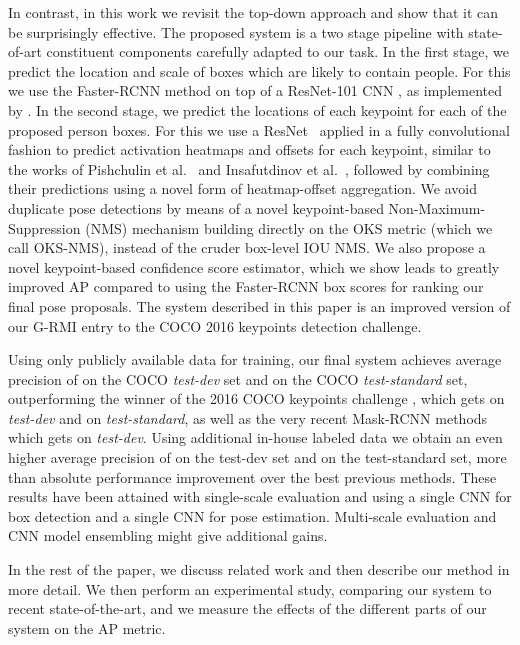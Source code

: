 \documentclass[10pt,twocolumn,letterpaper]{article}
\begin{document}
In contrast, in this work we revisit the top-down approach and show that it can be surprisingly effective. The proposed system is a two stage pipeline with state-of-art constituent components carefully adapted to our task. In the first stage, we predict the location and scale of boxes which are likely to contain people. For this we use the Faster-RCNN method \cite{Ren2015} on top of a ResNet-101 CNN \cite{He2016ResNets}, as implemented by \cite{huang2016speed}. In the second stage, we predict the locations of each keypoint for each of the proposed person boxes. For this we use a ResNet~\cite{He2016ResNets} applied in a fully convolutional fashion to predict activation heatmaps and offsets for each keypoint, similar to the works of Pishchulin et al.~\cite{deepcut} and Insafutdinov et al.~\cite{deeper_cut}, followed by combining their predictions using a novel form of heatmap-offset aggregation. We avoid duplicate pose detections by means of a novel keypoint-based Non-Maximum-Suppression (NMS) mechanism building directly on the OKS metric (which we call OKS-NMS), instead of the cruder box-level IOU NMS. We also propose a novel keypoint-based confidence score estimator, which we show leads to greatly improved AP compared to using the Faster-RCNN box scores for ranking our final pose proposals. The system described in this paper is an improved version of our G-RMI entry to the COCO 2016 keypoints detection challenge.

Using only publicly available data for training, our final system achieves average precision of  on the COCO \emph{test-dev} set and  on the COCO \emph{test-standard} set, outperforming the winner of the 2016 COCO keypoints challenge \cite{cmu_mscoco}, which gets  on \emph{test-dev} and  on \emph{test-standard}, as well as the very recent Mask-RCNN \cite{he2017mask} methods which gets  on \emph{test-dev}. Using additional in-house labeled data we obtain an even higher average precision of  on the test-dev set and  on the test-standard set, more than  absolute performance improvement over the best previous methods. These results have been attained with single-scale evaluation and using a single CNN for box detection and a single CNN for pose estimation. Multi-scale evaluation and CNN model ensembling might give additional gains.

In the rest of the paper, we discuss related work and then describe our method in more detail. We then perform an experimental study, comparing our system to recent state-of-the-art, and we measure the effects of the different parts of our system on the AP metric.
\end{document}
